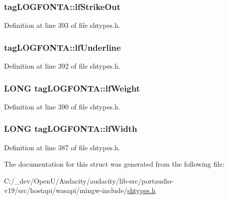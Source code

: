\subsubsection[{\texorpdfstring{lf\+Strike\+Out}{lfStrikeOut}}]{ tag\+L\+O\+G\+F\+O\+N\+T\+A\+::lf\+Strike\+Out}\hypertarget{structtag_l_o_g_f_o_n_t_a_a7feb83de4d2006034125a24145ac106d}{}\label{structtag_l_o_g_f_o_n_t_a_a7feb83de4d2006034125a24145ac106d}


Definition at line 393 of file shtypes.\+h.

\subsubsection[{\texorpdfstring{lf\+Underline}{lfUnderline}}]{ tag\+L\+O\+G\+F\+O\+N\+T\+A\+::lf\+Underline}\hypertarget{structtag_l_o_g_f_o_n_t_a_afec960775c444b7410d17b3092dba564}{}\label{structtag_l_o_g_f_o_n_t_a_afec960775c444b7410d17b3092dba564}


Definition at line 392 of file shtypes.\+h.

\subsubsection[{\texorpdfstring{lf\+Weight}{lfWeight}}]{\setlength{\rightskip}{0pt plus 5cm}L\+O\+NG tag\+L\+O\+G\+F\+O\+N\+T\+A\+::lf\+Weight}\hypertarget{structtag_l_o_g_f_o_n_t_a_a340caaf99719db93b514ce4df408a77d}{}\label{structtag_l_o_g_f_o_n_t_a_a340caaf99719db93b514ce4df408a77d}


Definition at line 390 of file shtypes.\+h.

\subsubsection[{\texorpdfstring{lf\+Width}{lfWidth}}]{\setlength{\rightskip}{0pt plus 5cm}L\+O\+NG tag\+L\+O\+G\+F\+O\+N\+T\+A\+::lf\+Width}\hypertarget{structtag_l_o_g_f_o_n_t_a_ad9b779faf6abe15cebae5eeb4b172b2b}{}\label{structtag_l_o_g_f_o_n_t_a_ad9b779faf6abe15cebae5eeb4b172b2b}


Definition at line 387 of file shtypes.\+h.



The documentation for this struct was generated from the following file\+:\begin{DoxyCompactItemize}
\item 
C\+:/\+\_\+dev/\+Open\+U/\+Audacity/audacity/lib-\/src/portaudio-\/v19/src/hostapi/wasapi/mingw-\/include/\hyperlink{shtypes_8h}{shtypes.\+h}\end{DoxyCompactItemize}
